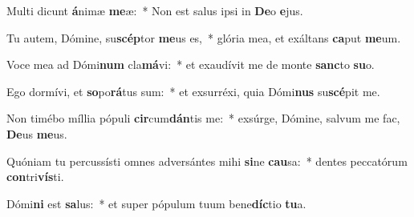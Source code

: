 \item Multi dicunt \textbf{á}nimæ \textbf{me}æ:~* Non est salus ipsi in \textbf{De}o \textbf{e}jus.
\item Tu autem, Dómine, su\textbf{scép}tor \textbf{me}us es,~* glória mea, et exáltans \textbf{ca}put \textbf{me}um.
\item Voce mea ad Dómi\textbf{num} cla\textbf{má}vi:~* et exaudívit me de monte \textbf{sanc}to \textbf{su}o.
\item Ego dormívi, et \textbf{so}po\textbf{rá}tus sum:~* et exsurréxi, quia Dómi\textbf{nus} su\textbf{scé}pit me.
\item Non timébo míllia pópuli \textbf{cir}cum\textbf{dán}tis me:~* exsúrge, Dómine, salvum me fac, \textbf{De}us \textbf{me}us.
\item Quóniam tu percussísti omnes adversántes mihi \textbf{si}ne \textbf{cau}sa:~* dentes peccatórum \textbf{con}tri\textbf{vís}ti.
\item Dómi\textbf{ni} est \textbf{sa}lus:~* et super pópulum tuum bene\textbf{díc}tio \textbf{tu}a.
